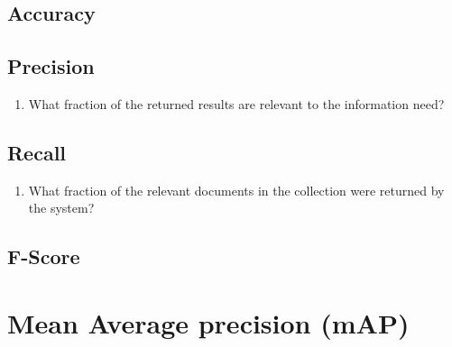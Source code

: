 \subsection{Accuracy}

\subsection{Precision}
\begin{enumerate}
    \item What fraction of the returned results are relevant to the information need? \cite{ir-1}
\end{enumerate}

\subsection{Recall}
\begin{enumerate}
    \item What fraction of the relevant documents in the collection were returned by the system? \cite{ir-1}
\end{enumerate}

\subsection{F-Score}


\section{Mean Average precision (mAP)}\label{Mean Average precision (mAP)}


















































